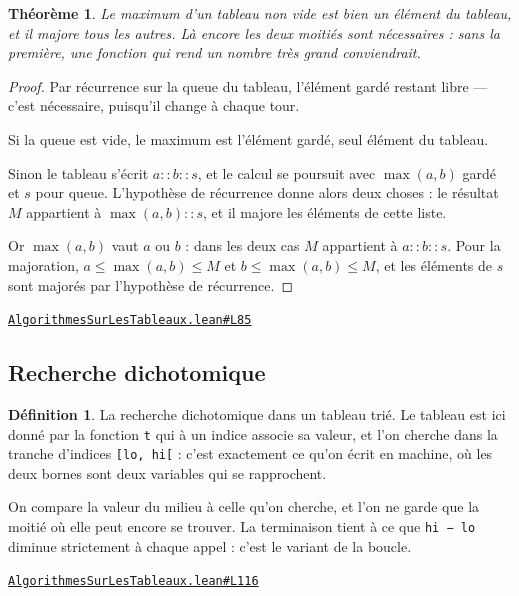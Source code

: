 \documentclass[11pt,a4paper]{article}
\theoremstyle{definition}
\newtheorem{definition}{Définition}
\theoremstyle{plain}
\newtheorem{theoreme}{Théorème}
\newcommand{\source}[2]{\par\smallskip\noindent\hfill{\footnotesize\href{#1}{\texttt{#2}}}\par\smallskip}
\begin{document}
\begin{theoreme}
Le maximum d'un tableau non vide est bien un élément du tableau, et il majore
tous les autres. Là encore les deux moitiés sont nécessaires : sans la première, une
fonction qui rend un nombre très grand conviendrait.
\end{theoreme}
\begin{proof}
Par récurrence sur la queue du tableau, l'élément gardé restant libre — c'est
nécessaire, puisqu'il change à chaque tour.

Si la queue est vide, le maximum est l'élément gardé, seul élément du tableau.

Sinon le tableau s'écrit \(a :: b :: s\), et le calcul se poursuit avec \(\max(a, b)\)
gardé et \(s\) pour queue. L'hypothèse de récurrence donne alors deux choses : le
résultat \(M\) appartient à \(\max(a,b) :: s\), et il majore les éléments de cette
liste.

Or \(\max(a,b)\) vaut \(a\) ou \(b\) : dans les deux cas \(M\) appartient à
\(a :: b :: s\). Pour la majoration, \(a \le \max(a,b) \le M\) et
\(b \le \max(a,b) \le M\), et les éléments de \(s\) sont majorés par l'hypothèse de
récurrence.
\end{proof}
\source{https://github.com/Commutator-IO/learn-lean/blob/main/courses/02-lycee/11-informatique-nsi/AlgorithmesSurLesTableaux.lean\#L85}{AlgorithmesSurLesTableaux.lean\#L85}

\subsection{Recherche dichotomique}

\begin{definition}
La recherche dichotomique dans un tableau trié. Le tableau est ici donné par la
fonction \texttt{t} qui à un indice associe sa valeur, et l'on cherche dans la tranche
d'indices \texttt{[lo, hi[} : c'est exactement ce qu'on écrit en machine, où les deux bornes
sont deux variables qui se rapprochent.

On compare la valeur du milieu à celle qu'on cherche, et l'on ne garde que la moitié
où elle peut encore se trouver. La terminaison tient à ce que \texttt{hi − lo} diminue
strictement à chaque appel : c'est le variant de la boucle.
\end{definition}
\source{https://github.com/Commutator-IO/learn-lean/blob/main/courses/02-lycee/11-informatique-nsi/AlgorithmesSurLesTableaux.lean\#L116}{AlgorithmesSurLesTableaux.lean\#L116}
\end{document}
